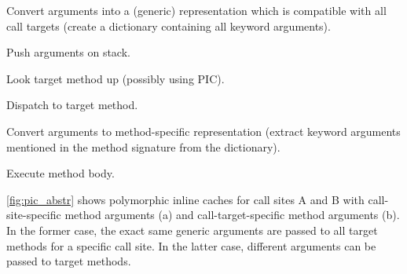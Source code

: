 \documentclass{sigplanconf} %
\begin{document}
\begin{Compactenum}
       \item Convert arguments into a (generic) representation which is compatible with all call targets (\eg create a dictionary containing all keyword arguments).
       \item Push arguments on stack.
       \item Look target method up (possibly using PIC).
       \item Dispatch to target method.
       \item Convert arguments to method-specific representation (\eg extract keyword arguments mentioned in the method signature from the dictionary).
       \item Execute method body.
\end{Compactenum}

\autoref{fig:pic_abstr} shows polymorphic inline caches for call sites A and B with call-site-specific method arguments (a) and call-target-specific method arguments (b). In the former case, the exact same generic arguments are passed to all target methods for a specific call site. In the latter case, different arguments can be passed to target methods.
\end{document}
